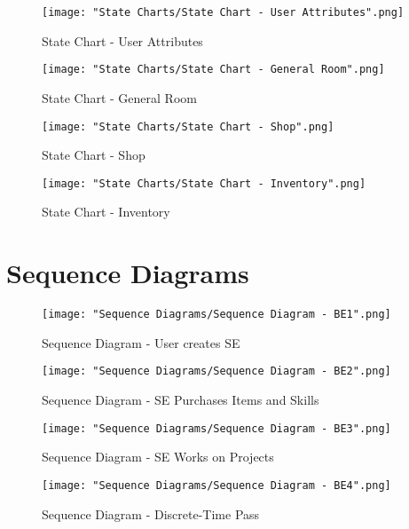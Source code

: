 \documentclass[]{article}
\begin{document}
\begin{figure}[H]
    \centering
    \texttt{[image: "State Charts/State Chart - User Attributes".png]}
    \caption{State Chart - User Attributes}
\end{figure}

\begin{figure}[H]
    \centering
    \texttt{[image: "State Charts/State Chart - General Room".png]}
    \caption{State Chart - General Room}
\end{figure}

\begin{figure}[H]
    \centering
    \texttt{[image: "State Charts/State Chart - Shop".png]}
    \caption{State Chart - Shop}
\end{figure}

\begin{figure}[H]
    \centering
    \texttt{[image: "State Charts/State Chart - Inventory".png]}
    \caption{State Chart - Inventory}
\end{figure}

\section{Sequence Diagrams}
\label{sec:sequence_diagrams}
\begin{figure}[H]
    \centering
    \texttt{[image: "Sequence Diagrams/Sequence Diagram - BE1".png]}
    \caption{Sequence Diagram - User creates SE}
\end{figure}

\begin{figure}[H]
    \centering
    \texttt{[image: "Sequence Diagrams/Sequence Diagram - BE2".png]}
    \caption{Sequence Diagram - SE Purchases Items and Skills}
\end{figure}

\begin{figure}[H]
    \centering
    \texttt{[image: "Sequence Diagrams/Sequence Diagram - BE3".png]}
    \caption{Sequence Diagram - SE Works on Projects}
\end{figure}

\begin{figure}[H]
    \centering
    \texttt{[image: "Sequence Diagrams/Sequence Diagram - BE4".png]}
    \caption{Sequence Diagram - Discrete-Time Pass}
\end{figure}
\end{document}
